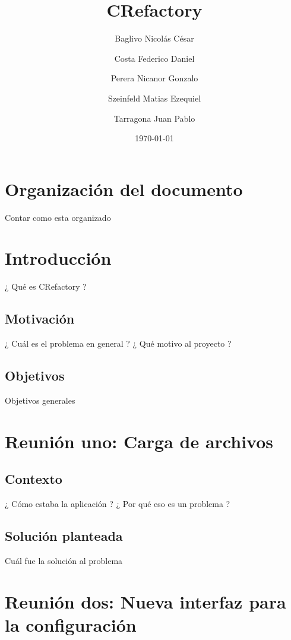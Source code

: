 \documentclass[a4paper,oneside,10pt]{article}
\begin{document}

\title{CRefactory}
\author{Baglivo Nicol\'as C\'esar \and Costa Federico Daniel \and Perera Nicanor Gonzalo \and Szeinfeld Matias Ezequiel \and Tarragona Juan Pablo}
\date{\today}
\maketitle

\tableofcontents

\section{Organizaci\'on del documento}
Contar como esta organizado

\section{Introducción}
¿ Qu\'e es CRefactory ?

\subsection{Motivaci\'on}
¿ Cu\'al es el problema en general ? ¿ Qu\'e motivo al proyecto ?

\subsection{Objetivos}
Objetivos generales

\section{Reuni\'on uno: Carga de archivos}

\subsection{Contexto}
¿ C\'omo estaba la aplicaci\'on ? ¿ Por qu\'e eso es un problema ?

\subsection{Soluci\'on planteada}
Cu\'al fue la soluci\'on al problema

\section{Reuni\'on dos: Nueva interfaz para la configuraci\'on}
\end{document}
